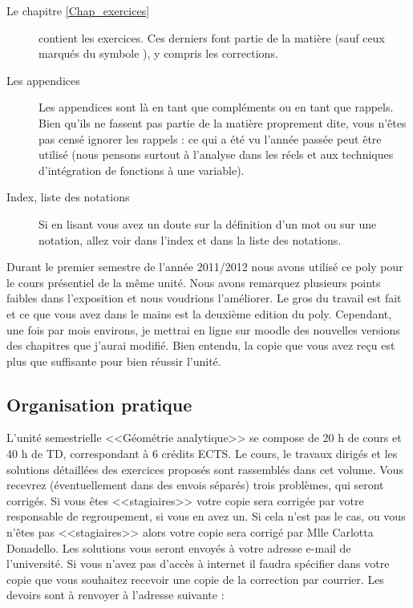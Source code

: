 \begin{description}
	\item[Le chapitre \ref{Chap_exercices}] contient les exercices. Ces derniers font partie de la matière (sauf ceux marqués du symbole \mortelexo), y compris les corrections.
	\item[Les appendices] Les appendices sont là en tant que compléments ou en tant que rappels. Bien qu'ils ne fassent pas partie de la matière proprement dite, vous n'êtes pas censé ignorer les rappels : ce qui a été vu l'année passée peut être utilisé (nous pensons surtout à l'analyse dans les réels et aux techniques d'intégration de fonctions à une variable).
	\item[Index, liste des notations] Si en lisant vous avez un doute sur la définition d'un mot ou sur une notation, allez voir dans l'index et dans la liste des notations.
\end{description}

Durant le premier semestre de l'année 2011/2012 nous avons utilisé ce poly pour le cours présentiel de la même unité. Nous avons remarquez plusieurs points faibles dans l'exposition et nous voudrions l'améliorer. Le gros du travail est fait et ce que vous avez dans le mains est la deuxième edition du poly. Cependant, une fois par mois environs, je mettrai en ligne sur moodle des nouvelles versions des chapitres que j'aurai modifié. Bien entendu, la copie que vous avez reçu est plus que suffisante pour bien réussir l'unité.       

\subsection*{Organisation pratique}
L'unité semestrielle <<Géométrie analytique>> se compose de 20 h de cours et 40 h de TD, correspondant à 6 crédits ECTS. 
Le cours, le travaux dirigés et les solutions détaillées des exercices proposés sont rassemblés dans cet volume. Vous recevrez (éventuellement dans des envois séparés) trois problèmes, qui seront corrigés. Si vous êtes  <<stagiaires>>  votre copie sera corrigée  par votre responsable de regroupement, si vous en avez  un. Si cela n'est pas le cas, ou vous n'êtes pas  <<stagiaires>> alors votre copie sera corrigé par Mlle Carlotta Donadello. Les solutions vous seront envoyés à votre adresse e-mail de l'université. Si vous n'avez pas d'accès à internet il faudra spécifier dans votre copie que vous souhaitez recevoir une copie de la correction par courrier. Les devoirs sont à renvoyer à l’adresse suivante : 

